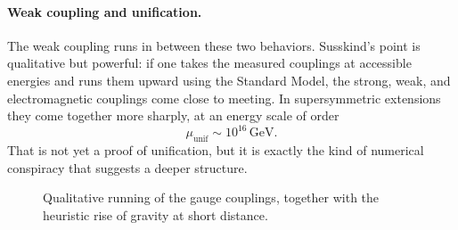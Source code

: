 \paragraph{Weak coupling and unification.}
The weak coupling runs in between these two behaviors. Susskind's point is qualitative but powerful: if one takes the measured couplings at accessible energies and runs them upward using the Standard Model, the strong, weak, and electromagnetic couplings come close to meeting. In supersymmetric extensions they come together more sharply, at an energy scale of order
\begin{equation}
\mu_{\mathrm{unif}}\sim 10^{16}\,\mathrm{GeV}.
\end{equation}
That is not yet a proof of unification, but it is exactly the kind of numerical conspiracy that suggests a deeper structure.

\begin{figure}[h]
\centering
{}
\caption{Qualitative running of the gauge couplings, together with the heuristic rise of gravity at short distance.}
\end{figure}

